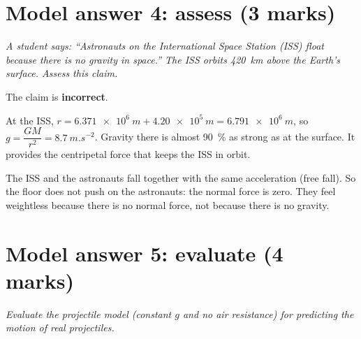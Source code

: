 \begin{markingcriteria}
\end{markingcriteria}

\section*{Model answer 4: assess (3 marks)}

\emph{A student says: ``Astronauts on the International Space Station (ISS) float because
there is no gravity in space.'' The ISS orbits \qty{420}{km} above the Earth's surface.
Assess this claim.}

\begin{modelanswer}
 The claim is \textbf{incorrect}.

 At the ISS, $r = \qty{6.371e6}{m} + \qty{4.20e5}{m} = \qty{6.791e6}{m}$, so
$g = \dfrac{GM}{r^2} = \qty{8.7}{m.s^{-2}}$. Gravity there is almost \qty{90}{\percent} as
strong as at the surface. It provides the centripetal force that keeps the ISS in orbit.

 The ISS and the astronauts fall together with the same acceleration (free fall).
So the floor does not push on the astronauts: the normal force is zero. They feel
weightless because there is no normal force, not because there is no gravity.
\end{modelanswer}

\begin{markingcriteria}
\end{markingcriteria}

\section*{Model answer 5: evaluate (4 marks)}

\emph{Evaluate the projectile model (constant $g$ and no air resistance) for predicting the
motion of real projectiles.}

